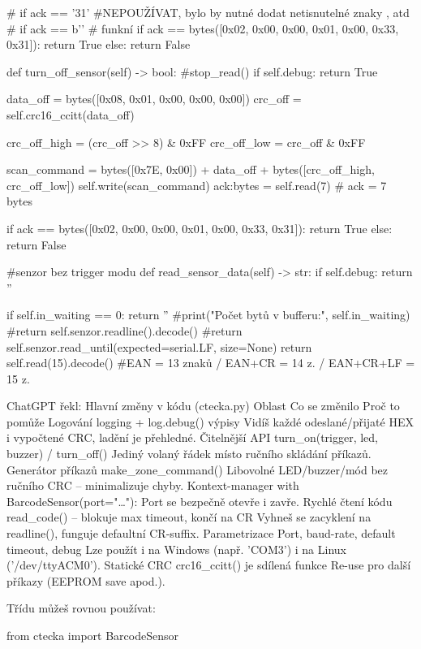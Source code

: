         # if ack == '31' #NEPOUŽÍVAT, bylo by nutné dodat netisnutelné znaky \cr, atd
        # if ack == b'' # funkní
        if ack == bytes([0x02, 0x00, 0x00, 0x01, 0x00, 0x33, 0x31]):
            return True
        else:
            return False

    def turn_off_sensor(self) -> bool: #stop_read()
        if self.debug:
            return True
        
        data_off = bytes([0x08, 0x01, 0x00, 0x00, 0x00])
        crc_off = self.crc16_ccitt(data_off)

        crc_off_high = (crc_off >> 8) & 0xFF
        crc_off_low = crc_off & 0xFF

        scan_command = bytes([0x7E, 0x00]) + data_off + bytes([crc_off_high, crc_off_low])
        self.write(scan_command)
        ack:bytes = self.read(7) # ack = 7 bytes

        if ack == bytes([0x02, 0x00, 0x00, 0x01, 0x00, 0x33, 0x31]):
            return True
        else:
            return False

    #senzor bez trigger modu
    def read_sensor_data(self) -> str:
        if self.debug:
            return ''

        if self.in_waiting == 0:
            return ''
        #print("Počet bytů v bufferu:", self.in_waiting)
        #return self.senzor.readline().decode()
        #return self.senzor.read_until(expected=serial.LF, size=None)
        return self.read(15).decode() #EAN = 13 znaků / EAN+CR = 14 z. / EAN+CR+LF = 15 z.
    
ChatGPT řekl:
Hlavní změny v kódu (ctecka.py)
Oblast	Co se změnilo	Proč to pomůže
Logování	logging + log.debug() výpisy	Vidíš každé odeslané/přijaté HEX i vypočtené CRC, ladění je přehledné.
Čitelnější API	turn_on(trigger, led, buzzer) / turn_off()	Jediný volaný řádek místo ručního skládání příkazů.
Generátor příkazů	make_zone_command()	Libovolné LED/buzzer/mód bez ručního CRC – minimalizuje chyby.
Kontext-manager	with BarcodeSensor(port="…"):	Port se bezpečně otevře i zavře.
Rychlé čtení kódu	read_code() – blokuje max timeout, končí na CR	Vyhneš se zacyklení na readline(), funguje defaultní CR-suffix.
Parametrizace	Port, baud-rate, default timeout, debug	Lze použít i na Windows (např. 'COM3') i na Linux ('/dev/ttyACM0').
Statické CRC	crc16_ccitt() je sdílená funkce	Re-use pro další příkazy (EEPROM save apod.).

Třídu můžeš rovnou používat:

from ctecka import BarcodeSensor

